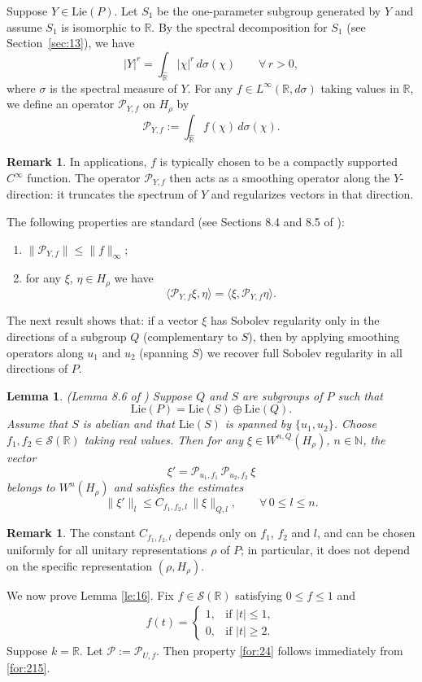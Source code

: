 \documentclass[11 pt]{amsart}
\newcommand{\NN}{\mathbb{N}}
\newcommand{\RR}{\mathbb{R}}
\newtheorem{lemma}[theorem]{Lemma}
\theoremstyle{definition}
\newtheorem{remark}[theorem]{Remark}
\numberwithin{equation}{section}
\def\Lie{\mathrm{Lie}}
\begin{document}
Suppose $Y\in \Lie(P)$. Let $S_1$ be the one-parameter subgroup generated by $Y$ and assume $S_1$ is isomorphic to $\RR$. By the spectral decomposition for $S_1$
(see Section~\ref{sec:13}), we have
\[
  |Y|^r = \int_{\widehat{\RR}} |\chi|^{r}\,d\sigma(\chi)\qquad \forall\,r>0,
\]
where $\sigma$ is the spectral measure of $Y$. For any $f\in L^\infty(\RR, d\sigma)$ taking values in $\RR$, we define an operator $\mathcal{P}_{Y,f}$ on $H_\rho$ by
\[
  \mathcal{P}_{Y,f}:=\int_{\widehat{\RR}} f(\chi)\, d\sigma(\chi).
\]
\begin{remark} In applications, $f$ is typically chosen to be a compactly supported
$C^\infty$ function. The operator $\mathcal{P}_{Y,f}$ then acts as a smoothing
operator along the $Y$-direction: it truncates the spectrum of $Y$ and
regularizes vectors in that direction.
\end{remark}
The following properties are standard (see Sections 8.4 and 8.5 of \cite{W5}):
\begin{enumerate}
 \item\label{for:215} $\|\mathcal{P}_{Y,f}\|\leq \|f\|_\infty$;
 \item\label{for:93} for any $\xi,\,\eta\in H_\rho$ we have
 \[
   \langle \mathcal{P}_{Y,f}\xi,\eta\rangle=\langle \xi,\mathcal{P}_{Y,f}\eta\rangle.
 \]
\end{enumerate}
The next result shows that: if a vector $\xi$ has Sobolev
regularity only in the directions of a subgroup $Q$ (complementary to $S$),
then by applying smoothing operators along $u_1$ and $u_2$ (spanning $S$) we
recover full Sobolev regularity in all directions of $P$.
\begin{lemma}\label{le:14} (Lemma 8.6 of \cite{W5})
Suppose $Q$ and $S$ are subgroups of $P$ such that
\[
  \Lie(P)=\Lie(S)\oplus\Lie(Q).
\]
Assume that $S$ is abelian and that $\Lie(S)$ is spanned by $\{u_1,u_2\}$.
Choose $f_1,f_2\in \mathcal{S}(\RR)$ taking real values. Then for any
$\xi\in W^{n,Q}(H_\rho)$, $n\in\NN$, the vector
\[
  \xi'=\mathcal{P}_{u_1,f_1}\,\mathcal{P}_{u_2,f_2}\,\xi
\]
belongs to $W^{n}(H_\rho)$ and satisfies the estimates
\[
  \|\xi'\|_{l}\leq C_{f_1,f_2,l}\,\|\xi\|_{Q,l},\qquad \forall\, 0\leq l\leq n.
\]
\end{lemma}
\begin{remark} The constant $C_{f_1,f_2,l}$ depends only on $f_1$, $f_2$ and $l$, and can be chosen
uniformly for all unitary representations $\rho$ of $P$; in particular, it does not
depend on the specific representation $(\rho,H_\rho)$.
\end{remark}
We now prove Lemma \ref{le:16}. Fix \( f\in \mathcal{S}(\mathbb{R}) \) satisfying  $0\leq f\leq 1$ and
\begin{align}\label{for:269}
 f(t) =
\begin{cases}
1, & \text{if } |t| \leq 1, \\
0, & \text{if } |t| \geq 2.
\end{cases}
\end{align}
Suppose $k=\RR$.  Let $\mathcal{P}:=\mathcal{P}_{U,f}$. Then property \eqref{for:24} follows immediately from \eqref{for:215}.
\end{document}
